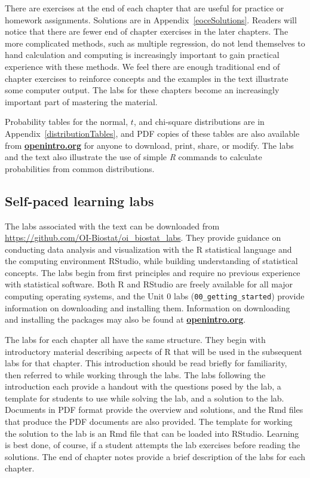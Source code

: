 There are exercises at the end of each chapter that are useful for practice or homework assignments. Solutions are in Appendix~\ref{eoceSolutions}. Readers will notice that there are fewer end of chapter exercises in the later chapters.  The more complicated methods, such as multiple regression, do not lend themselves to hand calculation and computing is increasingly important to gain practical experience with these methods.  We feel there are enough traditional end of chapter exercises to reinforce concepts and the examples in the text illustrate some computer output.  The labs for these chapters become an increasingly important part of mastering the material.

Probability tables for the normal, $t$, and chi-square distributions are in Appendix~\ref{distributionTables}, and PDF copies of these tables are also available from \href{http://www.openintro.org}{\color{black}\textbf{openintro.org}} for anyone to download, print, share, or modify.  The labs and the text also illustrate the use of simple \textsl{R} commands to calculate probabilities from common distributions.

\subsection*{Self-paced learning labs}

The labs associated with the text can be downloaded from \url{https://github.com/OI-Biostat/oi_biostat_labs}.  They provide guidance on conducting data analysis and visualization with the \textsf{R} statistical language and the computing environment RStudio, while building understanding of statistical concepts.  The labs begin from first principles and require no previous experience with statistical software. Both \textsf{R} and RStudio are freely available for all major computing operating systems, and the Unit 0 labs (\texttt{00\_getting\_started}) provide information on downloading and installing them. Information on downloading and installing the packages may also be found at \href{http://www.openintro.org}{\color{black}\textbf{openintro.org}}. 

The labs for each chapter all have the same structure. They begin with introductory material describing aspects of \textsf{R} that will be used in the subsequent labs for that chapter.  This introduction should be read briefly for familiarity, then referred to while working through the labs.  The labs following the introduction each provide a handout with the questions posed by the lab, a template for students to use while solving the lab, and a solution to the lab. Documents in PDF format provide the overview and solutions, and the Rmd files that produce the PDF documents are also provided. The template for working the solution to the lab is an Rmd file that  can be loaded into RStudio.   Learning is best done, of course, if a student attempts the lab exercises before reading the solutions.  The end of chapter notes provide a brief description of the labs for each chapter.

